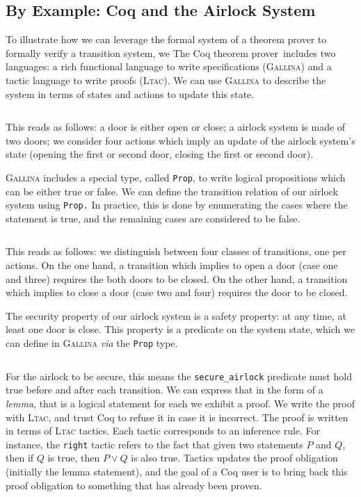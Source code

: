 \documentclass[oneside,a4paper]{memoir}
\theoremstyle{break}
\begin{document}
\subsection{By Example: Coq and the Airlock System}

To illustrate how we can leverage the formal system of a theorem prover to
formally verify a transition system, we
%
The Coq theorem prover\,\cite{coq} includes two languages: a rich functional
language to write specifications ({\scshape Gallina}) and a tactic language to
write proofs ({\scshape Ltac}).
We can use {\scshape Gallina} to describe the system in terms of states and
actions to update this state.

\inputminted[firstline=1,lastline=14]{coq}{Listings/Airlock.v}

This reads as follows: a door is either open or close; a airlock system is made
of two doors; we consider four actions which imply an update of the airlock
system's state (opening the first or second door, closing the first or second
door).

{\scshape Gallina} includes a special type, called \texttt{Prop}, to write
logical propositions which can be either true or false.
%
We can define the transition relation of our airlock system using \texttt{Prop.}
%
In practice, this is done by enumerating the cases where the statement is true,
and the remaining cases are considered to be false.

\inputminted[firstline=16,lastline=33]{coq}{Listings/Airlock.v}

This reads as follows: we distinguish between four classes of transitions, one
per actions.
%
On the one hand, a transition which implies to open a door (case one and three)
requires the both doors to be closed.
%
On the other hand, a transition which implies to close a door (case two and
four) requires the door to be closed.

The security property of our airlock system is a safety property: at any time,
at least one door is close.
%
This property is a predicate on the system state, which we can define in
{\scshape Gallina} \emph{via} the \texttt{Prop} type.

\inputminted[firstline=35,lastline=38]{coq}{Listings/Airlock.v}

For the airlock to be secure, this means the \texttt{secure\_airlock} predicate
must hold true before and after each transition.
%
We can express that in the form of a \emph{lemma}, that is a logical statement
for each we exhibit a proof.
%
We write the proof with {\scshape Ltac}, and trust Coq to refuse it in case it
is incorrect.
%
The proof is written in terms of {\scshape Ltac} tactics.
%
Each tactic corresponds to an inference rule.
%
For instance, the \texttt{right} tactic refers to the fact that given two
statements $P$ and $Q$, then if $Q$ is true, then $P \vee Q$ is also
true. Tactics updates the proof obligation (initially the lemma statement), and
the goal of a Coq user is to bring back this proof obligation to something that
has already been proven.
\end{document}
